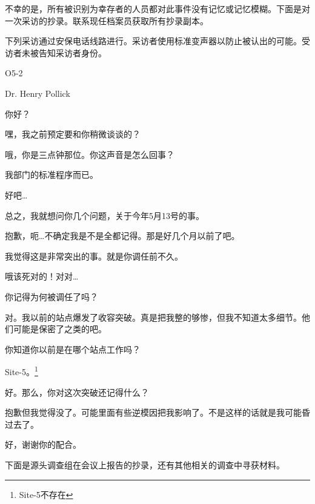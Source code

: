 不幸的是，所有被识别为幸存者的人员都对此事件没有记忆或记忆模糊。下面是对一次采访的抄录。联系现任档案员获取所有抄录副本。

\begin{scpbox}


下列采访通过安保电话线路进行。采访者使用标准变声器以防止被认出的可能。受访者未被告知采访者身份。

O5-2

Dr. Henry Pollick

\hr

你好？

嘿，我之前预定要和你稍微谈谈的？

哦，你是三点钟那位。你这声音是怎么回事？

我部门的标准程序而已。

好吧…

总之，我就想问你几个问题，关于今年5月13号的事。

抱歉，呃…不确定我是不是全都记得。那是好几个月以前了吧。

我觉得这是非常突出的事。就是你调任前不久。

哦该死对的！对对…

你记得为何被调任了吗？

对。我以前的站点爆发了收容突破。真是把我整的够惨，但我不知道太多细节。他们可能是保密了之类的吧。

你知道你以前是在哪个站点工作吗？

Site-5。\footnote{Site-5不存在}

好。那么，你对这次突破还记得什么？

抱歉但我觉得没了。可能里面有些逆模因把我影响了。不是这样的话就是我可能昏过去了。

好，谢谢你的配合。

\end{scpbox}

下面是源头调查组在会议上报告的抄录，还有其他相关的调查中寻获材料。

